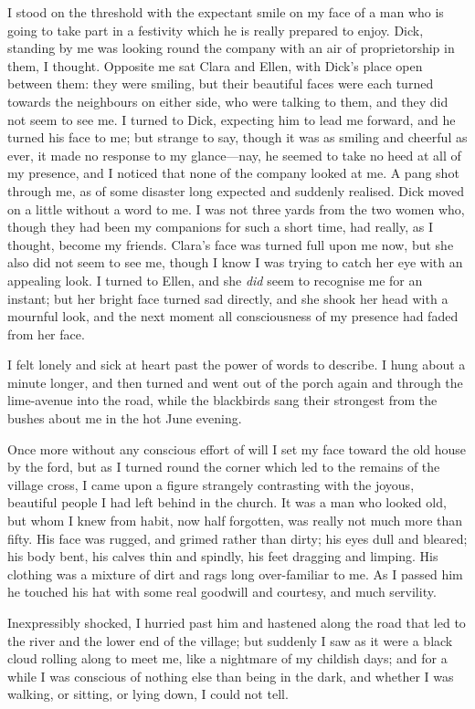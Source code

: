 I stood on the threshold with the expectant smile on my face of a man
who is going to take part in a festivity which he is really prepared to
enjoy. Dick, standing by me was looking round the company with an air of
proprietorship in them, I thought. Opposite me sat Clara and Ellen, with
Dick's place open between them: they were smiling, but their beautiful
faces were each turned towards the neighbours on either side, who were
talking to them, and they did not seem to see me. I turned to Dick,
expecting him to lead me forward, and he turned his face to me; but
strange to say, though it was as smiling and cheerful as ever, it made
no response to my glance---nay, he seemed to take no heed at all of my
presence, and I noticed that none of the company looked at me. A pang
shot through me, as of some disaster long expected and suddenly
realised. Dick moved on a little without a word to me. I was not three
yards from the two women who, though they had been my companions for
such a short time, had really, as I thought, become my friends. Clara's
face was turned full upon me now, but she also did not seem to see me,
though I know I was trying to catch her eye with an appealing look. I
turned to Ellen, and she \emph{did} seem to recognise me for an instant;
but her bright face turned sad directly, and she shook her head with a
mournful look, and the next moment all consciousness of my presence had
faded from her face.

I felt lonely and sick at heart past the power of words to describe. I
hung about a minute longer, and then turned and went out of the porch
again and through the lime-avenue into the road, while the blackbirds
sang their strongest from the bushes about me in the hot June evening.

Once more without any conscious effort of will I set my face toward the
old house by the ford, but as I turned round the corner which led to the
remains of the village cross, I came upon a figure strangely contrasting
with the joyous, beautiful people I had left behind in the church. It
was a man who looked old, but whom I knew from habit, now half
forgotten, was really not much more than fifty. His face was rugged, and
grimed rather than dirty; his eyes dull and bleared; his body bent, his
calves thin and spindly, his feet dragging and limping. His clothing was
a mixture of dirt and rags long over-familiar to me. As I passed him he
touched his hat with some real goodwill and courtesy, and much
servility.

Inexpressibly shocked, I hurried past him and hastened along the road
that led to the river and the lower end of the village; but suddenly I
saw as it were a black cloud rolling along to meet me, like a nightmare
of my childish days; and for a while I was conscious of nothing else
than being in the dark, and whether I was walking, or sitting, or lying
down, I could not tell.

